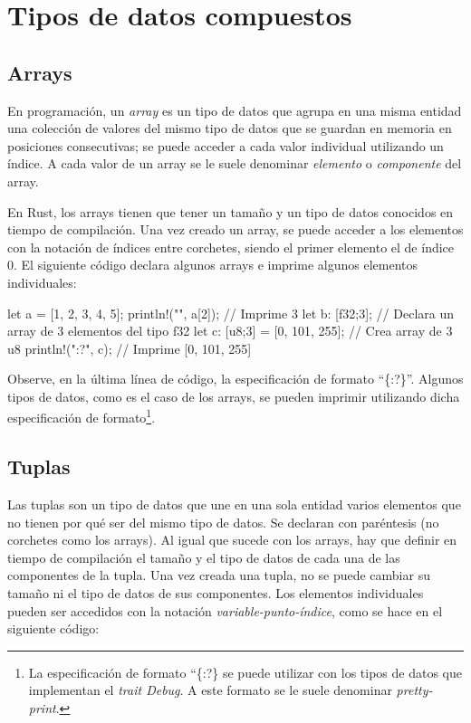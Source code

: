 \section{Tipos de datos compuestos}

\subsection{Arrays}
\noindent En programación, un \textit{array} es un tipo de datos que agrupa en una misma entidad una colección de valores del mismo tipo de datos que se guardan en memoria en posiciones consecutivas; se puede acceder a cada valor individual utilizando un índice. A cada valor de un array se le suele denominar \textit{elemento} o \textit{componente} del array.

En Rust, los arrays tienen que tener un tamaño y un tipo de datos conocidos en tiempo de compilación. Una vez creado un array, se puede acceder a los elementos con la notación de índices entre corchetes, siendo el primer elemento el de índice 0. El siguiente código declara algunos arrays e imprime algunos elementos individuales:

\vspace{0.7em}
\begin{Codigo}
let a = [1, 2, 3, 4, 5];
println!("{}", a[2]); // Imprime 3
let b: [f32;3]; // Declara un array de 3 elementos del tipo f32
let c: [u8;3] = [0, 101, 255]; // Crea array de 3 u8
println!("{:?}", c); // Imprime [0, 101, 255]
\end{Codigo}

Observe, en la última línea de código, la especificación de formato ``\{:?\}''. Algunos tipos de datos, como es el caso de los arrays, se pueden imprimir utilizando dicha especificación de formato\footnote{La especificación de formato ``\{:?\} se puede utilizar con los tipos de datos que implementan el \textit{trait Debug}. A este formato se le suele denominar \textit{pretty-print}.}. 

\subsection{Tuplas}
\noindent Las tuplas son un tipo de datos que une en una sola entidad varios elementos que no tienen por qué ser del mismo tipo de datos. Se declaran con paréntesis (no corchetes como los arrays). Al igual que sucede con los arrays, hay que definir en tiempo de compilación el tamaño y el tipo de datos de cada una de las componentes de la tupla. Una vez creada una tupla, no se puede cambiar su tamaño ni el tipo de datos de sus componentes. Los elementos individuales pueden ser accedidos con la notación \textit{variable-punto-índice}, como se hace en el siguiente código:

